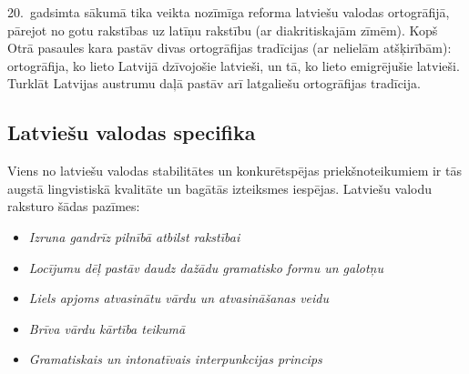 \begin{multicols}{2}
20.~gadsimta sākumā tika veikta nozīmīga reforma latviešu valodas ortogrāfijā, pārejot no gotu rakstības uz latīņu rakstību (ar diakritiskajām zīmēm).
Kopš Otrā pasaules kara pastāv divas ortogrāfijas tradīcijas (ar nelielām atšķirībām): ortogrāfija, ko lieto Latvijā dzīvojošie latvieši, un tā, ko lieto emigrējušie latvieši.
Turklāt Latvijas austrumu daļā pastāv arī latgaliešu ortogrāfijas tradīcija.

\subsection{Latviešu valodas specifika}


Viens no latviešu valodas stabilitātes un konkurētspējas priekšnoteikumiem ir tās augstā lingvistiskā kvalitāte un bagātās izteiksmes iespējas.
Latviešu valodu raksturo šādas pazīmes:

\begin{itemize}
\item  \textit{Izruna gandrīz pilnībā atbilst rakstībai}
\item \textit{Locījumu dēļ pastāv daudz dažādu gramatisko formu un galotņu}
\item \textit{Liels apjoms atvasinātu vārdu un atvasināšanas veidu}
\item \textit{Brīva vārdu kārtība teikumā}
\item \textit{Gramatiskais un intonatīvais interpunkcijas princips}
\end{itemize}



\end{multicols}
